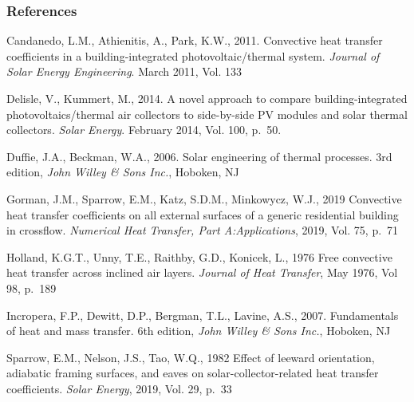 \subsubsection{References}\label{BIPVT-references}

Candanedo, L.M., Athienitis, A., Park, K.W., 2011. Convective heat transfer coefficients in a building-integrated photovoltaic/thermal system. \emph{Journal of Solar Energy Engineering}. March 2011, Vol. 133

Delisle, V., Kummert, M., 2014. A novel approach to compare building-integrated \mbox{photovoltaics/thermal} air collectors to side-by-side PV modules and solar thermal collectors. \emph{Solar Energy}. February 2014, Vol. 100, p.~50.

Duffie, J.A., Beckman, W.A., 2006. Solar engineering of thermal processes. 3rd edition, \emph{John Willey \& Sons Inc.}, Hoboken, NJ

Gorman, J.M., Sparrow, E.M., Katz, S.D.M., Minkowycz, W.J., 2019 Convective heat transfer coefficients on all external surfaces of a generic residential building in crossflow. \emph{Numerical Heat Transfer, Part A:Applications}, 2019, Vol. 75, p.~71

Holland, K.G.T., Unny, T.E., Raithby, G.D., Konicek, L., 1976 Free convective heat transfer across inclined air layers. \emph{Journal of Heat Transfer}, May 1976, Vol 98, p.~189

Incropera, F.P., Dewitt, D.P., Bergman, T.L., Lavine, A.S., 2007. Fundamentals of heat and mass transfer. 6th edition, \emph{John Willey \& Sons Inc.}, Hoboken, NJ

Sparrow, E.M., Nelson, J.S., Tao, W.Q., 1982 Effect of leeward orientation, adiabatic framing surfaces, and eaves on solar-collector-related heat transfer coefficients. \emph{Solar Energy}, 2019, Vol. 29, p.~33
